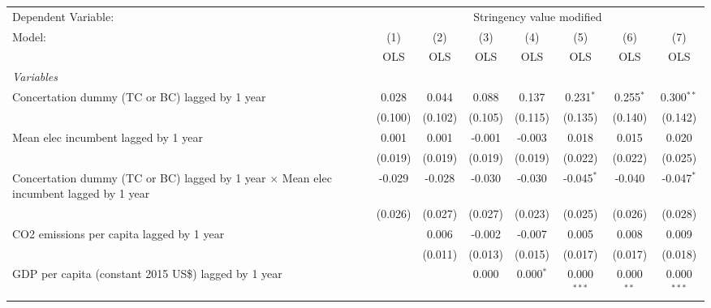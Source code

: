 
\begingroup
\centering
\begin{tabular}{lccccccc}
   \toprule
   Dependent Variable: & \multicolumn{7}{c}{Stringency value modified}\\
   Model:                                                                                        & (1)     & (2)     & (3)     & (4)         & (5)           & (6)          & (7)\\  
                                                                                                 &  OLS    & OLS     & OLS     & OLS         & OLS           & OLS          & OLS\\  
   \midrule
   \emph{Variables}\\
   Concertation dummy (TC or BC) lagged by 1 year                                                & 0.028   & 0.044   & 0.088   & 0.137       & 0.231$^{*}$   & 0.255$^{*}$  & 0.300$^{**}$\\   
                                                                                                 & (0.100) & (0.102) & (0.105) & (0.115)     & (0.135)       & (0.140)      & (0.142)\\   
   Mean elec incumbent lagged by 1 year                                                          & 0.001   & 0.001   & -0.001  & -0.003      & 0.018         & 0.015        & 0.020\\   
                                                                                                 & (0.019) & (0.019) & (0.019) & (0.019)     & (0.022)       & (0.022)      & (0.025)\\   
   Concertation dummy (TC or BC) lagged by 1 year $\times$ Mean elec incumbent lagged by 1 year  & -0.029  & -0.028  & -0.030  & -0.030      & -0.045$^{*}$  & -0.040       & -0.047$^{*}$\\   
                                                                                                 & (0.026) & (0.027) & (0.027) & (0.023)     & (0.025)       & (0.026)      & (0.028)\\   
   CO2 emissions per capita lagged by 1 year                                                     &         & 0.006   & -0.002  & -0.007      & 0.005         & 0.008        & 0.009\\   
                                                                                                 &         & (0.011) & (0.013) & (0.015)     & (0.017)       & (0.017)      & (0.018)\\   
   GDP per capita (constant 2015 US\$) lagged by 1 year                                          &         &         & 0.000   & 0.000$^{*}$ & 0.000$^{***}$ & 0.000$^{**}$ & 0.000$^{***}$\\   

\end{tabular}
